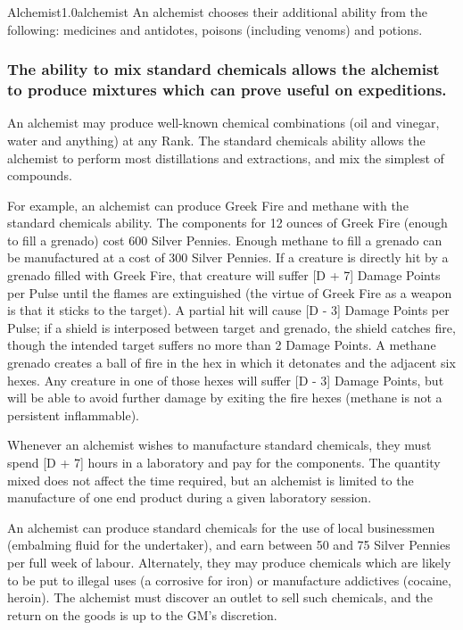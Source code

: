\begin{skill}{Alchemist}{1.0}{alchemist}
An alchemist chooses their additional ability from the following:
medicines and antidotes, poisons (including venoms) and potions.

\subsubsection{The ability to mix standard chemicals allows the
alchemist to produce mixtures which can prove useful on expeditions.}

An alchemist may produce well-known chemical combinations (\eg oil
and vinegar, water and anything) at any Rank.  The standard chemicals
ability allows the alchemist to perform most distillations and
extractions, and mix the simplest of compounds.

For example, an alchemist can produce Greek Fire and methane with the
standard chemicals ability.  The components for 12 ounces of Greek
Fire (enough to fill a grenado) cost 600 Silver Pennies.  Enough
methane to fill a grenado can be manufactured at a cost of 300 Silver
Pennies.  If a creature is directly hit by a grenado filled with Greek
Fire, that creature will suffer [D + 7] Damage Points per Pulse until
the flames are extinguished (the virtue of Greek Fire as a weapon is
that it sticks to the target).  A partial hit will cause [D - 3]
Damage Points per Pulse; if a shield is interposed between target and
grenado, the shield catches fire, though the intended target suffers
no more than 2 Damage Points.  A methane grenado creates a ball of
fire in the hex in which it detonates and the adjacent six hexes.  Any
creature in one of those hexes will suffer [D - 3] Damage Points, but
will be able to avoid further damage by exiting the fire hexes
(methane is not a persistent inflammable).

Whenever an alchemist wishes to manufacture standard chemicals, they
must spend [D + 7] hours in a laboratory and pay for the components.
The quantity mixed does not affect the time required, but an alchemist
is limited to the manufacture of one end product during a given
laboratory session.

An alchemist can produce standard chemicals for the use of local
businessmen (\eg embalming fluid for the undertaker), and earn
between 50 and 75 Silver Pennies per full week of labour.
Alternately, they may produce chemicals which are likely to be put to
illegal uses (\eg a corrosive for iron) or manufacture addictives
(\eg cocaine, heroin).  The alchemist must discover an outlet to
sell such chemicals, and the return on the goods is up to the GM's
discretion.


\end{skill}
